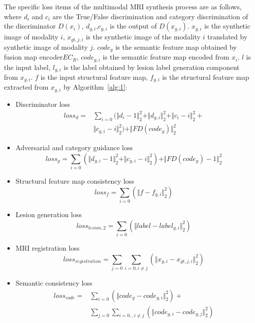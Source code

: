 \documentclass{ecai}
\begin{document}
The specific loss items of the multimodal MRI synthesis process are as follows, where $d_{i}$ and $c_{i}$ are the True/False discrimination and category discrimination of the discriminator $D(x_i)$, $d_{g, i}$,$c_{g,i}$ is the output of $D(x_{g,i})$. $x_{g,i}$ is the synthetic image of modality $i$, $x_{gt,j,i}$ is the synthetic image of the modality $i$ translated by synthetic image of modality $j$. $code_g$ is the semantic feature map obtained by fusion map encoder$EC_R$, $code_{g,i}$ is the semantic feature map encoded from $x_i$. $l$ is the input label, $l_{g,i}$ is the label obtained by lesion label generation component from $x_{g,i}$. $f$ is the input structural feature map, $f_{g,i}$ is the structural feature map extracted from $x_{g,i}$ by Algorithm~\ref{alg:1}:
\begin{itemize}
	\item{Discriminator loss }
	\begin{equation}
	\begin{split}
		loss_{d}=&\sum\limits_{i=0}(\Vert{d_{i}-1}\Vert_{2}^{2}+\Vert{d_{g,i}}\Vert_{2}^{2}+\Vert{c_{i}-i}\Vert_{2}^{2}+\\
		&\Vert{c_{g,i}-i}\Vert_{2}^{2})+\Vert{FD(code_{g})}\Vert_{2}^{2}
	\end{split}
	\end{equation}
	
	\item{Adversarial and category guidance loss}
	\begin{equation}
		loss_{g}=\sum\limits_{i=0}(\Vert{d_{g,i}-1}\Vert_{2}^{2}+\Vert{c_{g,i}-i}\Vert_{2}^{2})+\Vert{FD(code_{g})-1}\Vert_{2}^{2}
	\end{equation}
	
	\item{Structural feature map consistency loss}
	\begin{equation}
		loss_{f}=\sum\limits_{i=0}(\Vert{f-f_{g,i}}\Vert_{2}^{2})
	\end{equation}
	
	\item{Lesion generation loss}
	\begin{equation}
		loss_{lesion,2}=\sum\limits_{i=0}(\Vert{label-label_{g,i}}\Vert_{2}^{2})
	\end{equation}
	
	\item{MRI registration loss}
	\begin{equation}
		loss_{registration}=\sum\limits_{j=0}\sum\limits_{i=0,i\neq j}(\Vert{x_{g,i}-x_{gt,j,i}}\Vert_{2}^{2})
	\end{equation}
	
	\item{Semantic consistency loss}
	\begin{equation}
	\begin{split}
		loss_{code}=&\sum\limits_{i=0}(\Vert{code_g-code_{g,i}}\Vert_{2}^{2})+\\
		&\sum\limits_{j=0}\sum\limits_{i=0, ,i\neq j}(\Vert{code_{g,i}-code_{g,j}}\Vert_{2}^{2})
	\end{split}
	\end{equation}
	
\end{itemize}
\end{document}
